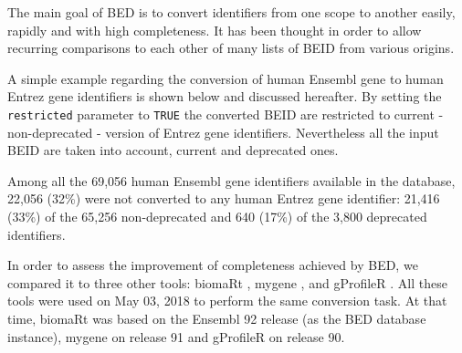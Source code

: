 \documentclass[9pt,a4paper,]{extarticle}
\newenvironment{Shaded}{\begin{snugshade}}{\end{snugshade}}
\newcommand{\KeywordTok}[1]{\textcolor[rgb]{0.13,0.29,0.53}{\textbf{#1}}}
\newcommand{\DataTypeTok}[1]{\textcolor[rgb]{0.13,0.29,0.53}{#1}}
\newcommand{\StringTok}[1]{\textcolor[rgb]{0.31,0.60,0.02}{#1}}
\newcommand{\OtherTok}[1]{\textcolor[rgb]{0.56,0.35,0.01}{#1}}
\newcommand{\OperatorTok}[1]{\textcolor[rgb]{0.81,0.36,0.00}{\textbf{#1}}}
\newcommand{\NormalTok}[1]{#1}
\theoremstyle{definition}
\theoremstyle{definition}
\theoremstyle{definition}
\theoremstyle{remark}
\begin{document}
The main goal of BED is to convert identifiers from one scope to another
easily, rapidly and with high completeness.
It has been thought in order to allow recurring comparisons to each other of
many lists of BEID from various origins.

A simple example regarding the conversion of human Ensembl
gene to human Entrez gene identifiers is shown below and discussed hereafter.
By setting the \texttt{restricted} parameter to \texttt{TRUE} the converted BEID are
restricted to current - non-deprecated - version of Entrez gene identifiers.
Nevertheless all the input BEID are taken into account,
current and deprecated ones.

\begin{Shaded}
\end{Shaded}

Among all the 69,056
human Ensembl gene identifiers available in the
database, 22,056
(32\%)
were not converted to any human Entrez gene
identifier: 21,416
(33\%)
of the 65,256 non-deprecated
and 640
(17\%)
of the 3,800 deprecated identifiers.

In order to assess the improvement of completeness achieved by BED, we compared
it to three other tools:
biomaRt \citep{kinsella_ensembl_2011, durinck_mapping_2009},
mygene \citep{wu_biogps_2013, mark_mygene:_2014},
and gProfileR \citep{reimand_g:profiler-web_2016, reimand_gprofiler:_2016}.
All these tools were used on May 03, 2018
to perform the same conversion task.
At that time, biomaRt was based on the Ensembl 92 release
(as the BED database instance),
mygene on release 91 and gProfileR on release 90.
\end{document}

